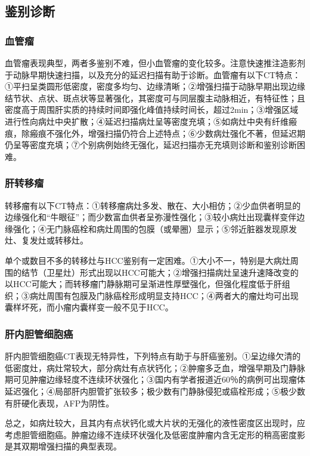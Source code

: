 \subsection{鉴别诊断}

\subsubsection{血管瘤}

血管瘤表现典型，两者多鉴别不难，但小血管瘤的变化较多。注意快速推注造影剂于动脉早期快速扫描，以及充分的延迟扫描有助于诊断。血管瘤有以下CT特点：①平扫呈类圆形低密度，密度多均匀、边缘清晰；②增强扫描于动脉早期出现边缘结节状、点状、斑点状等显著强化，其密度可与同层腹主动脉相近，有特征性；且密度高于周围肝实质的持续时间即强化峰值持续时间长，超过2min；③增强区域进行性向病灶中央扩散；④延迟扫描病灶呈等密度充填；⑤如病灶中央有纤维瘢痕，除瘢痕不强化外，增强扫描仍符合上述特点；⑥少数病灶强化不著，但延迟期仍呈等密度充填；⑦个别病例始终无强化，延迟扫描亦无充填则诊断和鉴别诊断困难。

\subsubsection{肝转移瘤}

转移瘤有以下CT特点：①转移瘤病灶多发、散在、大小相仿；②少血供者明显的边缘强化和“牛眼征”；而少数富血供者呈弥漫性强化；③较小病灶出现囊样变伴边缘强化；④无门脉癌栓和病灶周围的包膜（或晕圈）显示；⑤邻近脏器发现原发灶、复发灶或转移灶。

单个或数目不多的转移灶与HCC鉴别有一定困难。①大小不一，特别是大病灶周围的结节（卫星灶）形式出现以HCC可能大；②增强扫描病灶呈速升速降改变的以HCC可能大；而转移瘤门静脉期可呈渐进性厚壁强化，但强化程度低于肝组织；③病灶周围有包膜及门脉癌栓形成明显支持HCC；④两者大的瘤灶均可出现囊样坏死，而小瘤内囊样变一般不见于HCC。

\subsubsection{肝内胆管细胞癌}

肝内胆管细胞癌CT表现无特异性，下列特点有助于与肝癌鉴别。①呈边缘欠清的低密度灶，病灶常较大，部分病灶有点状钙化；②肿瘤多乏血，增强早期及门静脉期可见肿瘤边缘轻度不连续环状强化；③国内有学者报道近60％的病例可出现瘤体延迟强化；④局部肝内胆管扩张较多；极少数有门静脉侵犯或癌栓形成；⑤极少数有肝硬化表现，AFP为阴性。

总之，如病灶较大，且其内有点状钙化或大片状的无强化的液性密度区出现时，应考虑胆管细胞癌。肿瘤边缘不连续环状强化及低密度肿瘤内含无定形的稍高密度影是其双期增强扫描的典型表现。

